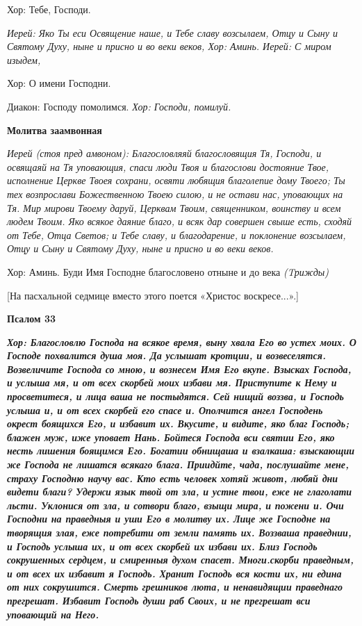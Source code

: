   Хор:\normalfont{} Тебе, Господи. 


\itshape Иерей:\normalfont{} Яко Ты еси Освящение наше, и Тебе славу возсылаем, Отцу и Сыну и Святому Духу, ныне и присно и во веки веков, \itshape  Хор:\normalfont{} Аминь. \itshape  Иерей: С\normalfont{} миром изыдем, \itshape 


  Хор:\normalfont{} О имени Господни. \itshape 


  Диакон:\normalfont{} Господу помолимся. \itshape  Хор:\normalfont{} Господи, помилуй. 


\medskip\bfseries Молитва заамвонная \normalfont{}\nopagebreak


\itshape   Иерей (стоя пред амвоном):\normalfont{} Благословляяй благословящия Тя, Господи, и освящаяй на Тя уповающия, спаси люди Твоя и благослови достояние Твое, исполнение Церкве Твоея сохрани, освяти любящия благолепие дому Твоего; Ты тех возпрослави Божественною Твоею силою, и не остави нас, уповающих на Тя. Мир мирови Твоему даруй, Церквам Твоим, священником, воинству и всем людем Твоим. Яко всякое даяние благо, и всяк дар совершен свыше есть, сходяй от Тебе, Отца Светов; и Тебе славу, и благодарение, и поклонение возсылаем, Отцу и Сыну и Святому Духу, ныне и присно и во веки веков. \itshape 


  Хор:\normalfont{} Аминь. Буди Имя Господне благословено отныне и до века \itshape (Tрижд\normalfont{}ы)


  [На пасхальной седмице вместо этого поется «Христос воскресе...».]


\medskip\bfseries  Псалом 33 \normalfont{}\nopagebreak


\bfseries  \normalfont{}\itshape  Хор:\normalfont{} Благословлю Господа на всякое время, выну хвала Его во устех моих. О Господе похвалится душа моя. Да услышат кротции, и возвеселятся. Возвеличите Господа со мною, и вознесем Имя Его вкупе. Взысках Господа, и услыша мя, и от всех скорбей моих избави мя. Приступите к Нему и просветитеся, и лица ваша не постыдятся. Сей нищий воззва, и Господь услыша и, и от всех скорбей его спасе и. Ополчится ангел Господень окрест боящихся Его, и избавит их. Вкусите, и видите, яко благ Господь; блажен муж, иже уповает Нань. Бойтеся Господа вси святии Его, яко несть лишения боящимся Его. Богатии обнищаша и взалкаша: взыскающии же Господа не лишатся всякаго блага. Приидйте, чада, послушайте мене, страху Господню научу вас. Кто есть человек хотяй живот, любяй дни видети благи? Удержи язык твой от зла, и устне твои, еже не глаголати льсти. Уклонися от зла, и сотвори благо, взыщи мира, и пожени и. Очи Господни на праведныя и уши Его в молитву их. Лице же Господне на творящия злая, еже потребити от земли память их. Воззваша праведнии, и Господь услыша их, и от всех скорбей их избави их. Близ Господь сокрушенных сердцем, и смиренныя духом спасет. Многи.скорби праведным, и от всех их избавит я Господь. Хранит Господь вся кости их, ни едина от них сокрушится. Смерть грешников люта, и ненавидящии праведнаго прегрешат. Избавит Господь души раб Своих, и не прегрешат вси уповающий на Него.


